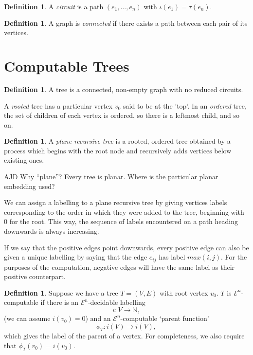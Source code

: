 \documentclass[a4paper]{article}
\newcommand{\grz}[1]{$\mathcal{E}^{#1}$}	%
\newcommand{\NN}{\mathbb{N}}	%
\theoremstyle{plain}
\theoremstyle{definition}
\newtheorem{definition}[theorem]{Definition}
\newenvironment{ad}{\noindent\color{green} AJD }{}
\newcommand{\ajd}[1]{
\begin{ad} #1 \end{ad}}
\begin{document}
\begin{definition}
A {\it circuit} is a path $(e_1, \dots, e_n)$ with $\iota(e_1) = \tau(e_n)$. 
\end{definition}

\begin{definition}
A graph is {\it connected} if there exists a path between each pair of its vertices.
\end{definition}

\section{Computable Trees \label{trees}}

\begin{definition}
A tree is a connected, non-empty graph with no reduced circuits.

A {\it rooted} tree has a particular vertex $v_0$ said to be at the 'top'. In an {\it ordered} tree, the set of children of each vertex is ordered, so there is a leftmost child, and so on. 
\end{definition}

\begin{definition}
A {\it plane recursive tree} is a rooted, ordered tree obtained by a process which begins with the root node and recursively adds vertices below existing ones.
\end{definition}
\ajd{Why ``plane''? Every tree is planar. Where is the particular planar
embedding used?}

We can assign a labelling to a plane recursive tree by giving vertices labels corresponding to the order in which they were added to the tree, beginning with $0$ for the root. This way, the sequence of labels encountered on a path heading downwards is always increasing. 

If we say that the positive edges point downwards, every positive edge can also be given a unique labelling by saying that the edge $e_{ij}$ has label $max(i,j)$. For the purposes of the computation, negative edges will have the same label as their positive counterpart.

\begin{definition}
Suppose we have a tree $T=(V,E)$ with root vertex $v_0$. $T$ is \grz{n}-computable if there is an \grz{n}-decidable labelling 
\[i: V \rightarrow \NN,\]
(we can assume $i(v_0) = 0$) and an \grz{n}-computable `parent function'
\[\phi_T:i(V) \rightarrow i(V),\]
which gives the label of the parent of a vertex. For completeness, we also require that $\phi_T(v_0) = i(v_0)$.
\end{definition}
\end{document}
